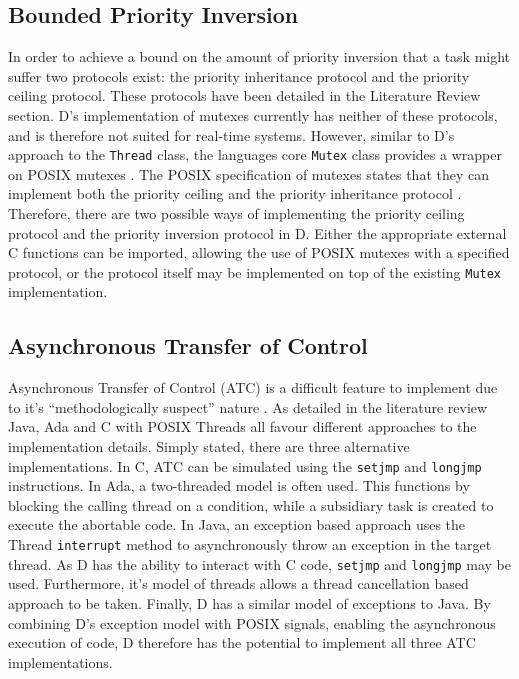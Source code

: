 \subsection{Bounded Priority Inversion} %
In order to achieve a bound on the amount of priority inversion that a task
might suffer two protocols exist: the priority inheritance protocol and the
priority ceiling protocol. These protocols have been detailed in the 
Literature Review section. D's implementation of mutexes currently has
neither of these protocols, and is therefore not suited for real-time systems.
However, similar to D's approach to the \texttt{Thread} class, the languages
core \texttt{Mutex} class provides a wrapper on POSIX mutexes
\cite{dlang-github-mutex}. The POSIX specification of mutexes states that
they can implement both the priority ceiling and the priority inheritance protocol 
\cite{mutex-setprotocol}. Therefore, there are two possible ways of
implementing the priority ceiling protocol and the priority inversion protocol
in D. Either the appropriate external C functions can be imported, allowing the
use of POSIX mutexes with a specified protocol, or the protocol itself may be
implemented on top of the existing \texttt{Mutex} implementation. 

\subsection{Asynchronous Transfer of Control} %
Asynchronous Transfer of Control (ATC) is a difficult feature to implement due to
it's ``methodologically suspect'' nature \cite{Brosgol:2002:ATC}. As detailed
in the literature review Java, Ada and C with POSIX Threads all favour
different approaches to the implementation details. Simply stated, there are
three alternative implementations. In C, ATC can be simulated using the
\texttt{setjmp} and \texttt{longjmp} instructions. In Ada, a
two-threaded model is often used. This functions by blocking the calling thread
on a condition, while a subsidiary task is created to execute the abortable
code. In Java, an exception based approach uses the Thread \texttt{interrupt}
method to asynchronously throw an exception in the target thread. As D has the
ability to interact with C code, \texttt{setjmp} and \texttt{longjmp} may be
used. Furthermore, it's model of threads allows a thread cancellation based
approach to be taken. Finally, D has a similar model of exceptions to Java. By
combining D's exception model with POSIX signals, enabling the asynchronous
execution of code, D therefore has the potential to implement all three ATC
implementations. 

